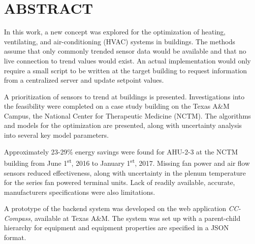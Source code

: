 %
%
%

\chapter*{\texorpdfstring{\MakeUppercase{ABSTRACT}}{ABSTRACT}}

\pagestyle{plain} %
\setcounter{page}{2}

\indent  In this work, a new concept was explored for the optimization
of heating, ventilating, and air-conditioning (HVAC) systems in
buildings. The methods assume that only commonly trended sensor data
would be available and that no live connection to trend values would
exist.  An actual implementation would only require a small script to be
written at the target building to request information from a centralized
server and update setpoint values. 

A prioritization of sensors to trend at buildings is presented.
Investigations into the feasibility were completed on a case study
building on the Texas A\&M Campus, the National Center for Therapeutic
Medicine (NCTM). The algorithms and models for the optimization are
presented, along with uncertainty analysis into several key model
parameters. 

Approximately 23-29\% energy savings were found for AHU-2-3 at the NCTM
building from June 1\textsuperscript{st}, 2016 to January
1\textsuperscript{st}, 2017.  Missing fan power and air flow sensors
reduced effectiveness, along with uncertainty in the plenum temperature
for the series fan powered terminal units. Lack of readily available,
accurate, manufacturers specifications were also limitations.  

A prototype of the backend system was developed on the web application
\textit{CC-Compass}, available at Texas A\&M. The system was set up with
a parent-child hierarchy for equipment and equipment properties are
specified in a JSON format. 
 

\pagebreak{}
